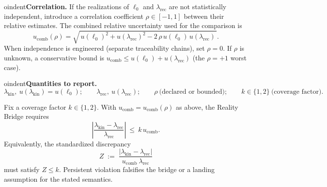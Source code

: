 \documentclass[11pt]{article}
\theoremstyle{plain}
\theoremstyle{definition}
\theoremstyle{remark}
\begin{document}
\medskip

oindent\textbf{Correlation.} If the realizations of \(\ell_{0}\) and \(\lambda_{\mathrm{rec}}\) are not statistically independent, introduce a correlation coefficient \(\rho\in[-1,1]\) between their relative estimates. The combined relative uncertainty used for the comparison is
\[
u_{\mathrm{comb}}(\rho)
=\sqrt{\,u(\ell_{0})^{2}+u(\lambda_{\mathrm{rec}})^{2}-2\,\rho\,u(\ell_{0})\,u(\lambda_{\mathrm{rec}})\,}.
\]
When independence is engineered (separate traceability chains), set \(\rho=0\). If \(\rho\) is unknown, a conservative bound is \(u_{\mathrm{comb}}\le u(\ell_{0})+u(\lambda_{\mathrm{rec}})\) (the \(\rho=+1\) worst case).

\medskip

oindent\textbf{Quantities to report.}
\[
\lambda_{\mathrm{kin}},\ u(\lambda_{\mathrm{kin}})=u(\ell_{0});\qquad
\lambda_{\mathrm{rec}},\ u(\lambda_{\mathrm{rec}});\qquad
\rho\ \text{(declared or bounded)};\qquad
k\in\{1,2\}\ \text{(coverage factor)}.
\]

\begin{theorem}
Fix a coverage factor \(k\in\{1,2\}\). With \(u_{\mathrm{comb}}=u_{\mathrm{comb}}(\rho)\) as above, the Reality Bridge requires
\[
\left|\frac{\lambda_{\mathrm{kin}}-\lambda_{\mathrm{rec}}}{\lambda_{\mathrm{rec}}}\right|
\ \le\ 
k\,u_{\mathrm{comb}}.
\]
Equivalently, the standardized discrepancy
\[
Z\;:=\;\frac{|\lambda_{\mathrm{kin}}-\lambda_{\mathrm{rec}}|}{u_{\mathrm{comb}}\ \lambda_{\mathrm{rec}}}
\]
must satisfy \(Z\le k\). Persistent violation falsifies the bridge or a landing assumption for the stated semantics.
\end{theorem}
\end{document}
